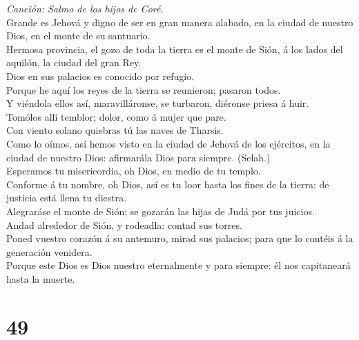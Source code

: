  \emph{Canción: Salmo de los hijos de Coré.}\\
Grande es Jehová y digno de ser en gran manera alabado, en la ciudad de
nuestro Dios, en el monte de su santuario.\\
 Hermosa provincia, el gozo de toda la tierra es el monte de
Sión, á los lados del aquilón, la ciudad del gran Rey.\\
 Dios en sus palacios es conocido por refugio.\\
 Porque he aquí los reyes de la tierra se reunieron; pasaron
todos.\\
 Y viéndola ellos así, maravilláronse, se turbaron, diéronse
priesa á huir.\\
 Tomólos allí temblor; dolor, como á mujer que pare.\\
 Con viento solano quiebras tú las naves de Tharsis.\\
 Como lo oímos, así hemos visto en la ciudad de Jehová de
los ejércitos, en la ciudad de nuestro Dios: afirmarála Dios para
siempre. (Selah.)\\
 Esperamos tu misericordia, oh Dios, en medio de tu
templo.\\
 Conforme á tu nombre, oh Dios, así es tu loor hasta los
fines de la tierra: de justicia está llena tu diestra.\\
 Alegraráse el monte de Sión; se gozarán las hijas de Judá
por tus juicios.\\
 Andad alrededor de Sión, y rodeadla: contad sus torres.\\
 Poned vuestro corazón á su antemuro, mirad sus palacios;
para que lo contéis á la generación venidera.\\
 Porque este Dios es Dios nuestro eternalmente y para
siempre: él nos capitaneará hasta la muerte.

\hypertarget{section-48}{%
\section{49}\label{section-48}}

